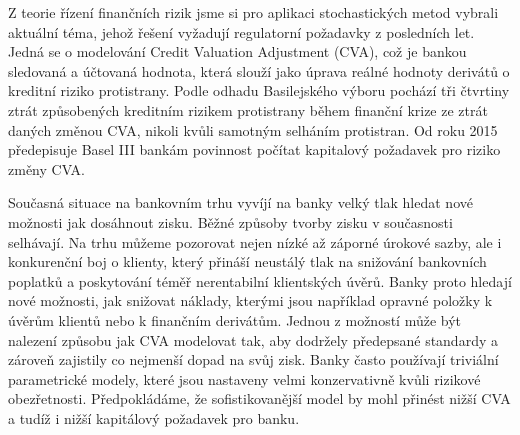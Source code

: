 \documentclass[a4paper,12pt]{report}
\theoremstyle{definition} \newtheorem{definice}[veta]{Definice}
\theoremstyle{remark}
\begin{document}

Z teorie řízení finančních rizik jsme si pro aplikaci stochastických metod vybrali aktuální téma, jehož řešení vyžadují regulatorní požadavky z posledních let.
Jedná se o modelování Credit Valuation Adjustment (CVA), což je bankou sledovaná a účtovaná hodnota, která slouží jako úprava reálné hodnoty derivátů o kreditní riziko protistrany.
Podle odhadu Basilejského výboru pochází tři čtvrtiny ztrát způsobených kreditním rizikem protistrany během finanční krize ze ztrát daných změnou CVA, nikoli kvůli samotným selháním protistran. 
Od roku 2015 předepisuje Basel III bankám povinnost počítat kapitalový požadavek pro riziko změny CVA.

Současná situace na bankovním trhu vyvíjí na banky velký tlak hledat nové možnosti jak dosáhnout zisku.
Běžné způsoby tvorby zisku v současnosti selhávají.
Na trhu můžeme pozorovat nejen nízké až záporné úrokové sazby, ale i konkurenční boj o klienty, který přináší neustálý tlak na snižování bankovních poplatků a poskytování téměř nerentabilní klientských úvěrů.
Banky proto hledají nové možnosti, jak snižovat náklady, kterými jsou například opravné položky k úvěrům klientů nebo k finančním derivátům.
Jednou z možností může být nalezení způsobu jak CVA modelovat tak, aby dodržely předepsané standardy a zároveň zajistily co nejmenší dopad na svůj zisk. 
Banky často používají triviální parametrické modely, které jsou nastaveny velmi konzervativně kvůli rizikové obezřetnosti.
Předpokládáme, že sofistikovanější model by mohl přinést nižší CVA a tudíž i nižší kapitálový požadavek pro banku. 
\end{document}
